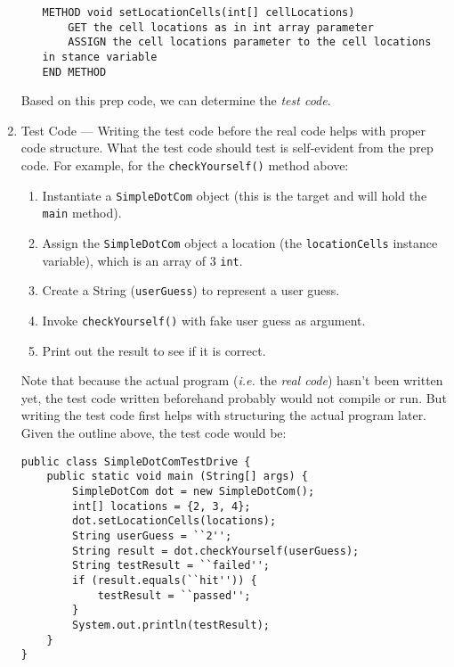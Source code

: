 \documentclass{tufte-handout}
\begin{document}
\begin{enumerate}
\begin{enumerate}
\begin{lstlisting}
METHOD void setLocationCells(int[] cellLocations)
    GET the cell locations as in int array parameter
    ASSIGN the cell locations parameter to the cell locations in stance variable
END METHOD
            \end{lstlisting}
        \end{enumerate}
        
        Based on this prep code, we can determine the \emph{test code}.
        \item Test Code --- Writing the test code before the real code helps with proper code structure. What the test code should test is self-evident from the prep code. For example, for the \texttt{checkYourself()} method above:
        \begin{enumerate}
            \item Instantiate a \texttt{SimpleDotCom} object (this is the target and will hold the \texttt{main} method).
            \item Assign the \texttt{SimpleDotCom} object a location (the \texttt{locationCells} instance variable), which is an array of 3 \texttt{int}.
            \item Create a String (\texttt{userGuess}) to represent a user guess.
            \item Invoke \texttt{checkYourself()} with fake user guess as argument.
            \item Print out the result to see if it is correct.
        \end{enumerate}

        Note that because the actual program (\textit{i.e.} the \emph{real code}) hasn't been written yet, the test code written beforehand probably would not compile or run. But writing the test code first helps with structuring the actual program later. Given the outline above, the test code would be:
        \begin{lstlisting}
public class SimpleDotComTestDrive {
    public static void main (String[] args) {
        SimpleDotCom dot = new SimpleDotCom();
        int[] locations = {2, 3, 4};
        dot.setLocationCells(locations);
        String userGuess = ``2'';
        String result = dot.checkYourself(userGuess);
        String testResult = ``failed'';
        if (result.equals(``hit'')) {
            testResult = ``passed'';
        }
        System.out.println(testResult);
    }
}
        \end{lstlisting}


\end{enumerate}
\end{document}
